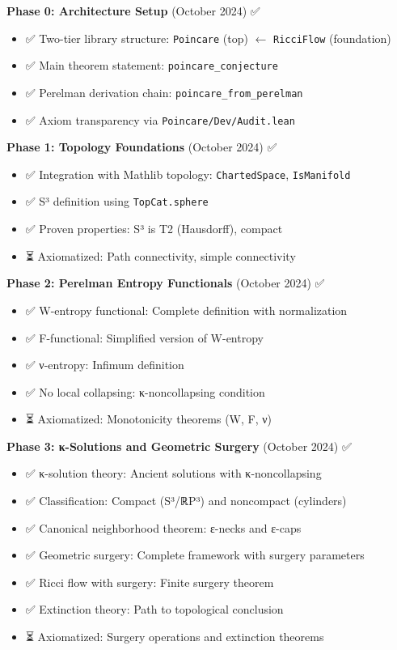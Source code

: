 \textbf{Phase 0: Architecture Setup} (October 2024) ✅

\begin{itemize}
\item ✅ Two-tier library structure: \texttt{Poincare} (top) $\leftarrow$ \texttt{RicciFlow} (foundation)
\item ✅ Main theorem statement: \texttt{poincare\_conjecture}
\item ✅ Perelman derivation chain: \texttt{poincare\_from\_perelman}
\item ✅ Axiom transparency via \texttt{Poincare/Dev/Audit.lean}
\end{itemize}

\textbf{Phase 1: Topology Foundations} (October 2024) ✅

\begin{itemize}
\item ✅ Integration with Mathlib topology: \texttt{ChartedSpace}, \texttt{IsManifold}
\item ✅ S³ definition using \texttt{TopCat.sphere}
\item ✅ Proven properties: S³ is T2 (Hausdorff), compact
\item ⏳ Axiomatized: Path connectivity, simple connectivity
\end{itemize}

\textbf{Phase 2: Perelman Entropy Functionals} (October 2024) ✅

\begin{itemize}
\item ✅ W-entropy functional: Complete definition with normalization
\item ✅ F-functional: Simplified version of W-entropy
\item ✅ ν-entropy: Infimum definition
\item ✅ No local collapsing: κ-noncollapsing condition
\item ⏳ Axiomatized: Monotonicity theorems (W, F, ν)
\end{itemize}

\textbf{Phase 3: κ-Solutions and Geometric Surgery} (October 2024) ✅

\begin{itemize}
\item ✅ κ-solution theory: Ancient solutions with κ-noncollapsing
\item ✅ Classification: Compact (S³/ℝP³) and noncompact (cylinders)
\item ✅ Canonical neighborhood theorem: ε-necks and ε-caps
\item ✅ Geometric surgery: Complete framework with surgery parameters
\item ✅ Ricci flow with surgery: Finite surgery theorem
\item ✅ Extinction theory: Path to topological conclusion
\item ⏳ Axiomatized: Surgery operations and extinction theorems
\end{itemize}


